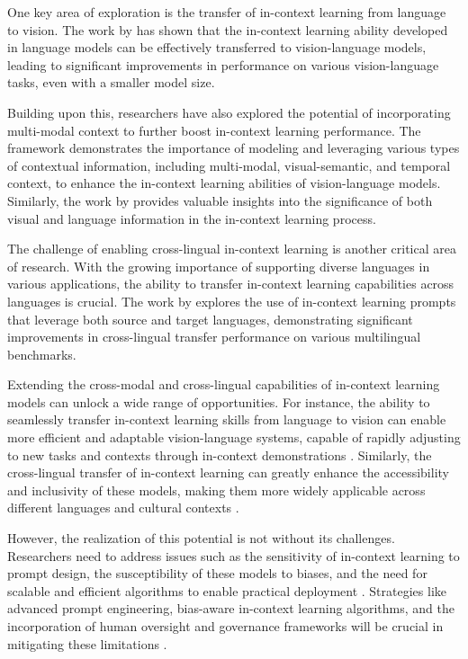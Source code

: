 \documentclass[11pt]{article}
\begin{document}
One key area of exploration is the transfer of in-context learning from language to vision. The work by \cite{ref241} has shown that the in-context learning ability developed in language models can be effectively transferred to vision-language models, leading to significant improvements in performance on various vision-language tasks, even with a smaller model size.

Building upon this, researchers have also explored the potential of incorporating multi-modal context to further boost in-context learning performance. The \cite{ref373} framework demonstrates the importance of modeling and leveraging various types of contextual information, including multi-modal, visual-semantic, and temporal context, to enhance the in-context learning abilities of vision-language models. Similarly, the work by \cite{ref132} provides valuable insights into the significance of both visual and language information in the in-context learning process.

The challenge of enabling cross-lingual in-context learning is another critical area of research. With the growing importance of supporting diverse languages in various applications, the ability to transfer in-context learning capabilities across languages is crucial. The work by \cite{ref77} explores the use of in-context learning prompts that leverage both source and target languages, demonstrating significant improvements in cross-lingual transfer performance on various multilingual benchmarks.

Extending the cross-modal and cross-lingual capabilities of in-context learning models can unlock a wide range of opportunities. For instance, the ability to seamlessly transfer in-context learning skills from language to vision can enable more efficient and adaptable vision-language systems, capable of rapidly adjusting to new tasks and contexts through in-context demonstrations \cite{ref241}. Similarly, the cross-lingual transfer of in-context learning can greatly enhance the accessibility and inclusivity of these models, making them more widely applicable across different languages and cultural contexts \cite{ref77}.

However, the realization of this potential is not without its challenges. Researchers need to address issues such as the sensitivity of in-context learning to prompt design, the susceptibility of these models to biases, and the need for scalable and efficient algorithms to enable practical deployment \cite{ref1}. Strategies like advanced prompt engineering, bias-aware in-context learning algorithms, and the incorporation of human oversight and governance frameworks will be crucial in mitigating these limitations \cite{ref1}.
\end{document}
